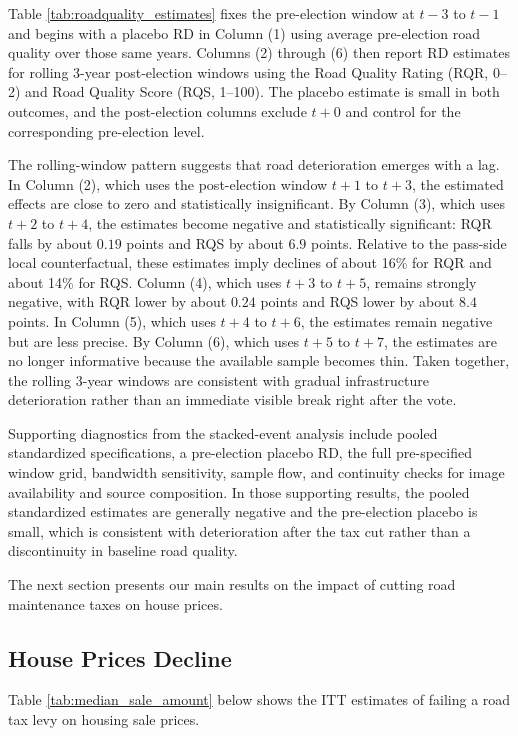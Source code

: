 Table \ref{tab:roadquality_estimates} fixes the pre-election window at $t-3$ to $t-1$ and begins with a placebo RD in Column (1) using average pre-election road quality over those same years. Columns (2) through (6) then report RD estimates for rolling 3-year post-election windows using the Road Quality Rating (RQR, 0--2) and Road Quality Score (RQS, 1--100). The placebo estimate is small in both outcomes, and the post-election columns exclude $t+0$ and control for the corresponding pre-election level.

The rolling-window pattern suggests that road deterioration emerges with a lag. In Column (2), which uses the post-election window $t+1$ to $t+3$, the estimated effects are close to zero and statistically insignificant. By Column (3), which uses $t+2$ to $t+4$, the estimates become negative and statistically significant: RQR falls by about $0.19$ points and RQS by about $6.9$ points. Relative to the pass-side local counterfactual, these estimates imply declines of about 16\% for RQR and about 14\% for RQS. Column (4), which uses $t+3$ to $t+5$, remains strongly negative, with RQR lower by about $0.24$ points and RQS lower by about $8.4$ points. In Column (5), which uses $t+4$ to $t+6$, the estimates remain negative but are less precise. By Column (6), which uses $t+5$ to $t+7$, the estimates are no longer informative because the available sample becomes thin. Taken together, the rolling 3-year windows are consistent with gradual infrastructure deterioration rather than an immediate visible break right after the vote.

Supporting diagnostics from the stacked-event analysis include pooled standardized specifications, a pre-election placebo RD, the full pre-specified window grid, bandwidth sensitivity, sample flow, and continuity checks for image availability and source composition. In those supporting results, the pooled standardized estimates are generally negative and the pre-election placebo is small, which is consistent with deterioration after the tax cut rather than a discontinuity in baseline road quality.

The next section presents our main results on the impact of cutting road maintenance taxes on house prices.

\subsection{House Prices Decline}

 Table \ref{tab:median_sale_amount} below shows the ITT estimates of failing a road tax levy on housing sale prices. 

